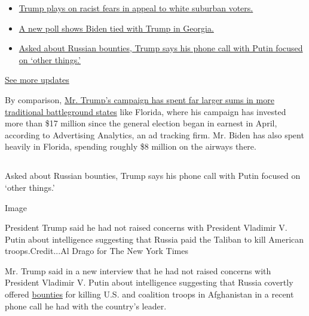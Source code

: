 \begin{itemize}
\tightlist
\item
  \href{https://www.nytimes.com/2020/07/29/us/elections/biden-vs-trump.html?action=click\&pgtype=Article\&state=default\&region=MAIN_CONTENT_1\&context=storylines_live_updates\#link-62c7451e}{Trump
  plays on racist fears in appeal to white suburban voters.}
\item
  \href{https://www.nytimes.com/2020/07/29/us/elections/biden-vs-trump.html?action=click\&pgtype=Article\&state=default\&region=MAIN_CONTENT_1\&context=storylines_live_updates\#link-44f0348}{A
  new poll shows Biden tied with Trump in Georgia.}
\item
  \href{https://www.nytimes.com/2020/07/29/us/elections/biden-vs-trump.html?action=click\&pgtype=Article\&state=default\&region=MAIN_CONTENT_1\&context=storylines_live_updates\#link-1550d1d7}{Asked
  about Russian bounties, Trump says his phone call with Putin focused
  on `other things.'}
\end{itemize}

\href{https://www.nytimes.com/2020/07/29/us/elections/biden-vs-trump.html?action=click\&pgtype=Article\&state=default\&region=MAIN_CONTENT_1\&context=storylines_live_updates}{See
more updates}

By comparison,
\href{https://www.nytimes.com/2020/07/28/us/politics/campaign-ad-buys.html}{Mr.
Trump's campaign has spent far larger sums in more traditional
battleground states} like Florida, where his campaign has invested more
than \$17 million since the general election began in earnest in April,
according to Advertising Analytics, an ad tracking firm. Mr. Biden has
also spent heavily in Florida, spending roughly \$8 million on the
airways there.

\hypertarget{-2}{%
\subsection{}\label{-2}}

Asked about Russian bounties, Trump says his phone call with Putin
focused on `other things.'

Image

President Trump said he had not raised concerns with President Vladimir
V. Putin about intelligence suggesting that Russia paid the Taliban to
kill American troops.Credit...Al Drago for The New York Times

Mr. Trump said in a new interview that he had not raised concerns with
President Vladimir V. Putin about intelligence suggesting that Russia
covertly offered
\href{https://www.nytimes.com/2020/07/03/world/europe/russia-bounties-putin-afghanistan.html}{bounties}
for killing U.S. and coalition troops in Afghanistan in a recent phone
call he had with the country's leader.

